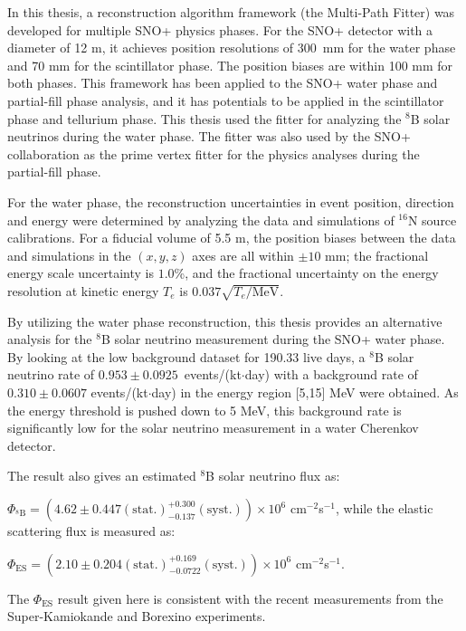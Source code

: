 In this thesis, a reconstruction algorithm framework (the Multi-Path Fitter) was developed for multiple SNO+ physics phases. For the SNO+ detector with a diameter of 12 m, it achieves position resolutions of 300~mm for the water phase and 70 mm for the scintillator phase. The position biases are within 100 mm for both phases. This framework has been applied to the SNO+ water phase and partial-fill phase analysis, and it has potentials to be applied in the scintillator phase and tellurium phase. This thesis used the fitter for analyzing the $^8$B solar neutrinos during the water phase. The fitter was also used by the SNO+ collaboration as the prime vertex fitter for the physics analyses during the partial-fill phase.

For the water phase, the reconstruction uncertainties in event position, direction and energy were determined by analyzing the data and simulations of $^{16}$N source calibrations. For a fiducial volume of 5.5 m, the position biases between the data and simulations in the $(x,y,z)$ axes are all within $\pm10$ mm; the fractional energy scale uncertainty is $1.0$\%, and the fractional uncertainty on the energy resolution at kinetic energy $T_e$ is $0.037\sqrt{T_e/\mathrm{MeV}}$.

By utilizing the water phase reconstruction, this thesis provides an alternative analysis for the $^8$B solar neutrino measurement during the SNO+ water phase. By looking at the low background dataset for 190.33 live days, a $^8$B solar neutrino rate of $0.953\pm0.0925$~events/(kt$\cdot$day) with a background rate of $0.310\pm 0.0607$ events/(kt$\cdot$day) in the energy region [5,15] MeV were obtained. As the energy threshold is pushed down to 5 MeV, this background rate is significantly low for the solar neutrino measurement in a water Cherenkov detector.

The result also gives an estimated $^8$B solar neutrino flux as: 

$\Phi_{\mathrm{^8B}}=(4.62 \pm 0.447 \mathrm{(stat.)}^{+0.300}_{-0.137}\mathrm{(syst.)})\times10^6$ cm$^{-2}$s$^{-1}$, 
while the elastic scattering flux is measured as: 

$\Phi_{\mathrm{ES}}=(2.10 \pm 0.204\mathrm{(stat.)}^{+0.169}_{-0.0722}\mathrm{(syst.)})\times10^6$ cm$^{-2}$s$^{-1}$.

The $\Phi_{\mathrm{ES}}$ result given here is consistent with the recent measurements from the Super-Kamiokande and Borexino experiments.